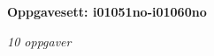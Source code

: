 \centerline{\bf Oppgavesett: i01051no-i01060no}
\vskip 10pt
\centerline{\it 10 oppgaver}\vskip 10pt
\vskip 10pt
